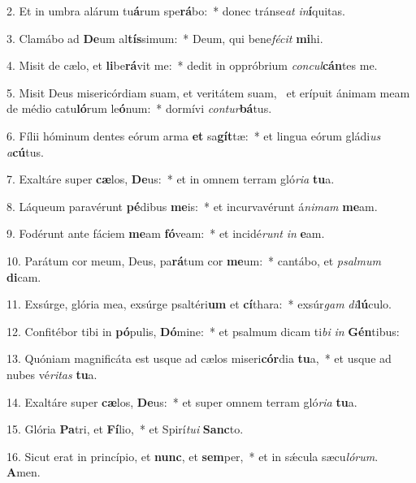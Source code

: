 2. Et in umbra alárum tu\textbf{á}rum spe\textbf{rá}bo:~*  donec tránse\textit{at} \textit{in}\textbf{í}quitas.\

3. Clamábo ad \textbf{De}um al\textbf{tís}simum:~*  Deum, qui bene\textit{fé}\textit{cit} \textbf{mi}hi.\

4. Misit de cælo, et \textbf{li}be\textbf{rá}vit me:~*  dedit in oppróbrium \textit{con}\textit{cul}\textbf{cán}tes me.\

5. Misit Deus misericórdiam suam, et veritátem suam, \dag\  et erípuit ánimam meam de médio catu\textbf{ló}rum le\textbf{ó}num:~*  dormívi \textit{con}\textit{tur}\textbf{bá}tus.\

6. Fílii hóminum dentes eórum arma \textbf{et} sa\textbf{gít}tæ:~*  et lingua eórum gládi\textit{us} \textit{a}\textbf{cú}tus.\

7. Exaltáre super \textbf{cæ}los, \textbf{De}us:~*  et in omnem terram gló\textit{ri}\textit{a} \textbf{tu}a.\

8. Láqueum paravérunt \textbf{pé}dibus \textbf{me}is:~*  et incurvavérunt á\textit{ni}\textit{mam} \textbf{me}am.\

9. Fodérunt ante fáciem \textbf{me}am \textbf{fó}veam:~*  et incidé\textit{runt} \textit{in} \textbf{e}am.\

10. Parátum cor meum, Deus, pa\textbf{rá}tum cor \textbf{me}um:~*  cantábo, et \textit{psal}\textit{mum} \textbf{di}cam.\

11. Exsúrge, glória mea, exsúrge psaltéri\textbf{um} et \textbf{cí}thara:~*  exsúr\textit{gam} \textit{di}\textbf{lú}culo.\

12. Confitébor tibi in \textbf{pó}pulis, \textbf{Dó}mine:~*  et psalmum dicam ti\textit{bi} \textit{in} \textbf{Gén}tibus:\

13. Quóniam magnificáta est usque ad cælos miseri\textbf{cór}dia \textbf{tu}a,~*  et usque ad nubes vé\textit{ri}\textit{tas} \textbf{tu}a.\

14. Exaltáre super \textbf{cæ}los, \textbf{De}us:~*  et super omnem terram gló\textit{ri}\textit{a} \textbf{tu}a.\

15. Glória \textbf{Pa}tri, et \textbf{Fí}lio,~*  et Spirí\textit{tu}\textit{i} \textbf{Sanc}to.\

16. Sicut erat in princípio, et \textbf{nunc}, et \textbf{sem}per,~*  et in sǽcula sæcu\textit{ló}\textit{rum}. \textbf{A}men.\

